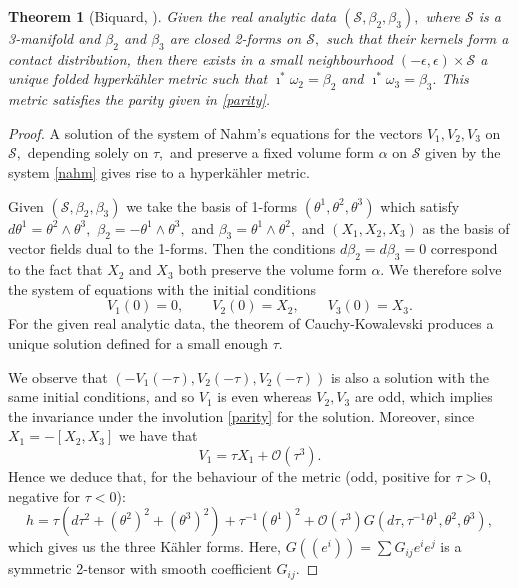 \documentclass[a4paper,onecolumn,12pt]{article}
\newtheorem{thm}{Theorem}[]
\theoremstyle{definition}
\theoremstyle{remark}
\newcommand{\w}{\omega}
\newcommand{\e}{\epsilon}
\newcommand{\K}{K\"ahler }
\newcommand{\HK}{hyperk\"ahler }
\begin{document}
\newpage


\begin{thm}[Biquard, \cite{biquard_2015}]
	Given the real analytic data $(\mathcal{S},\beta_{2},\beta_{3}),$ where $\mathcal{S}$ is a 3-manifold and $\beta_{2}$ and $\beta_{3}$ are closed 2-forms on $\mathcal{S},$ such that their kernels form a contact distribution, then there exists in a small neighbourhood $(-\e,\e)\times \mathcal{S}$ a unique folded \HK metric such that $\imath^{\ast}\w_{2}=\beta_{2}$ and $\imath^{\ast}\w_{3}=\beta_{3}.$ This metric satisfies the parity given in \ref{parity}.	
\end{thm}
\begin{proof}
	A solution of the system of Nahm's equations for the vectors $V_{1}, V_{2}, V_{3}$ on $\mathcal{S},$ depending solely on $\tau,$ and preserve a fixed volume form $\alpha$ on $\mathcal{S}$ given by the system \ref{nahm} gives rise to a \HK metric.
	
	Given $(\mathcal{S},\beta_{2},\beta_{3})$ we take the basis of 1-forms $(\theta^{1}, \theta^{2},\theta^{3})$ which satisfy $d\theta^{1} = \theta^{2}\wedge\theta^{3},$ $\beta_{2} = -\theta^{1}\wedge\theta^{3},$ and $\beta_{3} = \theta^{1}\wedge\theta^{2},$ and $(X_{1},X_{2},X_{3})$ as the basis of vector fields dual to the 1-forms. Then the conditions $d\beta_{2} = d\beta_{3}=0$ correspond to the fact that $X_{2}$ and $X_{3}$ both preserve the volume form $\alpha.$ We therefore solve the system of equations with the initial conditions
	\begin{equation}
		V_{1}(0) = 0,\qquad V_{2}(0) = X_{2},\qquad V_{3}(0) = X_{3}.
	\end{equation}
	For the given real analytic data, the theorem of Cauchy-Kowalevski produces a unique solution defined for a small enough $\tau.$
	
	We observe that $(-V_{1}(-\tau), V_{2}(-\tau), V_{2}(-\tau))$ is also a solution with the same initial conditions, and so $V_{1}$ is even whereas $V_{2}, V_{3}$ are odd, which implies the invariance under the involution \ref{parity} for the solution. Moreover, since $X_{1} = -[X_{2},X_{3}]$ we have that
	\begin{equation}
		V_{1} = \tau \label{key}X_{1} + \mathcal{O}(\tau^{3}).
	\end{equation}
	Hence we deduce that, for the behaviour of the metric (odd, positive for $\tau>0$, negative for $\tau<0$):
	\begin{equation}
	\label{HK_metric}
		h = \tau(d\tau^{2} + (\theta^{2})^{2} + (\theta^{3})^{2}) + \tau^{-1}(\theta^{1})^{2} + \mathcal{O}(\tau^{3})G(d\tau,\tau^{-1}\theta^{1}, \theta^{2}, \theta^{3}),
	\end{equation}
	which gives us the three \K forms. Here, $G((e^{i})) = \sum G_{ij}e^{i}e^{j}$ is a symmetric 2-tensor with smooth coefficient $G_{ij}.$
	

\end{proof}
\end{document}
